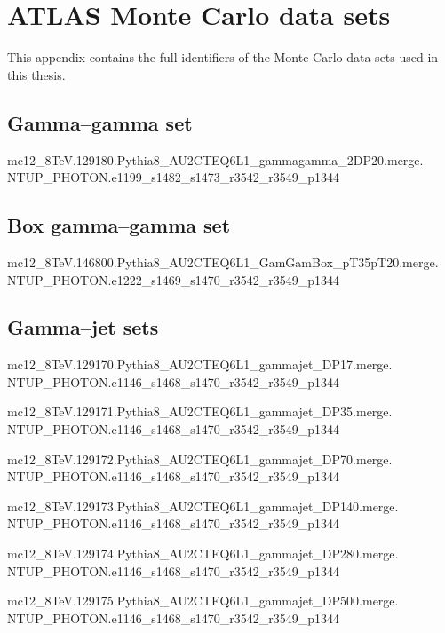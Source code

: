 \appendix

\chapter{ATLAS Monte Carlo data sets}
This appendix contains the full identifiers of the \atlas{} Monte Carlo data sets used in this thesis.

\section{Gamma--gamma set}\label{ax.gg}
mc12\_8TeV.129180.Pythia8\_AU2CTEQ6L1\_gammagamma\_2DP20.merge. \\NTUP\_PHOTON.e1199\_s1482\_s1473\_r3542\_r3549\_p1344

\section{Box gamma--gamma set}\label{ax.ggb}
mc12\_8TeV.146800.Pythia8\_AU2CTEQ6L1\_GamGamBox\_pT35pT20.merge. \\NTUP\_PHOTON.e1222\_s1469\_s1470\_r3542\_r3549\_p1344

\section{Gamma--jet sets}\label{ax.gj}
mc12\_8TeV.129170.Pythia8\_AU2CTEQ6L1\_gammajet\_DP17.merge. \\NTUP\_PHOTON.e1146\_s1468\_s1470\_r3542\_r3549\_p1344

mc12\_8TeV.129171.Pythia8\_AU2CTEQ6L1\_gammajet\_DP35.merge. \\NTUP\_PHOTON.e1146\_s1468\_s1470\_r3542\_r3549\_p1344

mc12\_8TeV.129172.Pythia8\_AU2CTEQ6L1\_gammajet\_DP70.merge. \\NTUP\_PHOTON.e1146\_s1468\_s1470\_r3542\_r3549\_p1344

mc12\_8TeV.129173.Pythia8\_AU2CTEQ6L1\_gammajet\_DP140.merge. \\NTUP\_PHOTON.e1146\_s1468\_s1470\_r3542\_r3549\_p1344

mc12\_8TeV.129174.Pythia8\_AU2CTEQ6L1\_gammajet\_DP280.merge. \\NTUP\_PHOTON.e1146\_s1468\_s1470\_r3542\_r3549\_p1344

mc12\_8TeV.129175.Pythia8\_AU2CTEQ6L1\_gammajet\_DP500.merge. \\NTUP\_PHOTON.e1146\_s1468\_s1470\_r3542\_r3549\_p1344

